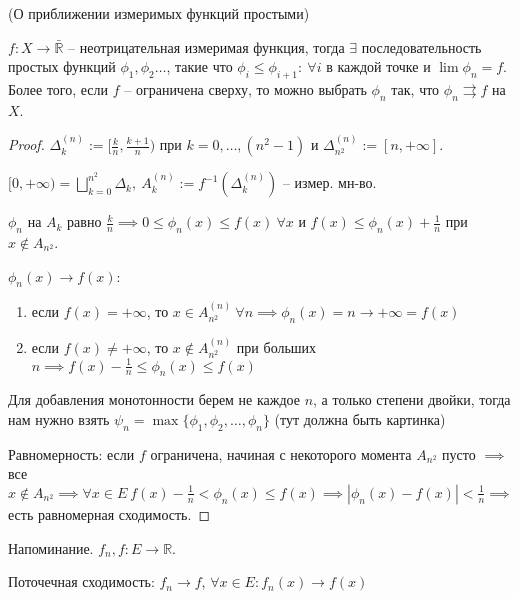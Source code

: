 \begin{theorem}
    (О приближении измеримых функций простыми)

    $f: X \rightarrow \bar{\mathbb{R}}$ -- неотрицательная измеримая функция, тогда $\exists$ последовательность простых функций $\phi_1, \phi_2 \dots$, такие что $\phi_{i} \leq \phi_{i + 1}: \ \forall i$ в каждой точке и $\lim{\phi_n} = f$. Более того, если $f$ -- ограничена сверху, то можно выбрать $\phi_n$ так, что $\phi_n \rightrightarrows f$ на $X$.
\end{theorem}
\begin{proof}
    $\Delta_k^{(n)} := [\frac{k}{n}, \frac{k+1}{n})$ при $k = 0, \dots, (n^2 - 1)$ и $\Delta_{n^2}^{(n)} := [n, +\infty]$.

    $[0, +\infty) = \bigsqcup_{k=0}^{n^2} \Delta_k, \ A_k^{(n)} := f^{-1}(\Delta_k^{(n)})$ -- измер. мн-во.

    $\phi_n$ на $A_k$ равно $\frac{k}{n} \implies 0 \leq \phi_n(x) \leq f(x) \ \forall x$ и $f(x) \leq \phi_n(x) + \frac{1}{n}$ при $x \notin A_{n^2}$.

    $\phi_n(x) \rightarrow f(x)$:

    \begin{enumerate}
        \item {
            если $f(x) = +\infty$, то $x \in A_{n^2}^{(n)} \ \forall n \implies \phi_n(x) = n \rightarrow +\infty = f(x)$
        }
        \item {
            если $f(x) \not = +\infty$, то $x \notin A_{n^2}^{(n)}$ при больших $n \implies f(x) - \frac{1}{n} \leq \phi_n(x) \leq f(x)$
        }
    \end{enumerate}

    Для добавления монотонности берем не каждое $n$, а только степени двойки, тогда нам нужно взять $\psi_n = \max\{ \phi_1, \phi_2, \dots, \phi_n \}$ (тут должна быть картинка)

    Равномерность: если $f$ ограничена, начиная с некоторого момента $A_{n^2}$ пусто $\implies$ все $x \not \in A_{n^2} \implies \forall x \in E\ f(x) - \frac{1}{n} < \phi_n(x) \leqslant f(x) \implies |\phi_n(x) - f(x)| < \frac{1}{n} \implies$ есть равномерная сходимость.
\end{proof}




Напоминание. $f_n, f : E \rightarrow \mathbb{R}$.

Поточечная сходимость: $f_n \to f$, $\forall x \in E: f_n(x) \rightarrow f(x)$

